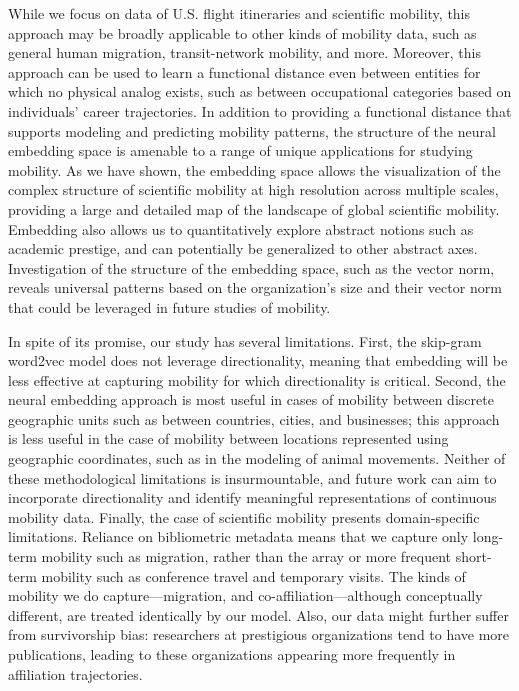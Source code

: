 \documentclass[12pt]{article} %
\begin{document}
While we focus on data of U.S. flight itineraries and scientific mobility, this approach may be broadly applicable to other kinds of mobility data, such as general human migration, transit-network mobility, and more.
Moreover, this approach can be used to learn a functional distance even between entities for which no physical analog exists, such as between occupational categories based on individuals' career trajectories.
In addition to providing a functional distance that supports modeling and predicting mobility patterns, the structure of the neural embedding space is amenable to a range of unique applications for studying mobility.
As we have shown, the embedding space allows the visualization of the complex structure of scientific mobility at high resolution across multiple scales, providing a large and detailed map of the landscape of global scientific mobility.
Embedding also allows us to quantitatively explore abstract notions such as academic prestige, and can potentially be generalized to other abstract axes.
Investigation of the structure of the embedding space, such as the vector norm, reveals universal patterns based on the organization's size and their vector norm that could be leveraged in future studies of mobility.


In spite of its promise, our study has several limitations.
First, the skip-gram word2vec model does not leverage directionality, meaning that embedding will be less effective at capturing mobility for which directionality is critical.
Second, the neural embedding approach is most useful in cases of mobility between discrete geographic units such as between countries, cities, and businesses; this approach is less useful in the case of mobility between locations represented using geographic coordinates, such as in the modeling of animal movements.
Neither of these methodological limitations is insurmountable, and future work can aim to incorporate directionality and identify meaningful representations of continuous mobility data.
Finally, the case of scientific mobility presents domain-specific limitations.
Reliance on bibliometric metadata means that we capture only long-term mobility such as migration, rather than the array or more frequent short-term mobility such as conference travel and temporary visits.
The kinds of mobility we do capture---migration, and co-affiliation---although conceptually different, are treated identically by our model.
Also, our data might further suffer from survivorship bias: researchers at prestigious organizations tend to have more publications, leading to these organizations appearing more frequently in affiliation trajectories.
\end{document}
